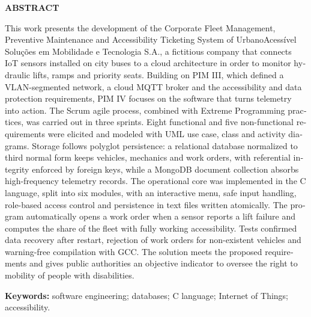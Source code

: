 \documentclass[12pt,a4paper,oneside]{report}
\newcommand{\titulocentral}[1]{%
  \begin{center}\textbf{\MakeUppercase{#1}}\end{center}\vspace{0.8\baselineskip}}
\begin{document}
\thispagestyle{empty}
\begin{otherlanguage}{english}
\titulocentral{Abstract}
\noindent
This work presents the development of the Corporate Fleet Management, Preventive Maintenance and
Accessibility Ticketing System of UrbanoAcessível Soluções em Mobilidade e Tecnologia S.A., a fictitious
company that connects IoT sensors installed on city buses to a cloud architecture in order to monitor
hydraulic lifts, ramps and priority seats. Building on PIM III, which defined a VLAN-segmented network,
a cloud MQTT broker and the accessibility and data protection requirements, PIM IV focuses on the
software that turns telemetry into action. The Scrum agile process, combined with Extreme Programming
practices, was carried out in three sprints. Eight functional and five non-functional requirements were
elicited and modeled with UML use case, class and activity diagrams. Storage follows polyglot
persistence: a relational database normalized to third normal form keeps vehicles, mechanics and work
orders, with referential integrity enforced by foreign keys, while a MongoDB document collection absorbs
high-frequency telemetry records. The operational core was implemented in the C language, split into six
modules, with an interactive menu, safe input handling, role-based access control and persistence in text
files written atomically. The program automatically opens a work order when a sensor reports a lift
failure and computes the share of the fleet with fully working accessibility. Tests confirmed data
recovery after restart, rejection of work orders for non-existent vehicles and warning-free compilation
with GCC. The solution meets the proposed requirements and gives public authorities an objective
indicator to oversee the right to mobility of people with disabilities.

\vspace{\baselineskip}
\noindent\textbf{Keywords:} software engineering; databases; C language; Internet of Things;
accessibility.
\end{otherlanguage}
\clearpage

\thispagestyle{empty}
\renewcommand{\listfigurename}{Lista de figuras}\renewcommand{\figurename}{Figura}
{\singlespacing\listoffigures}
\thispagestyle{empty}
\clearpage
\thispagestyle{empty}
{\singlespacing\listofquadros}
\thispagestyle{empty}
\clearpage
\end{document}

